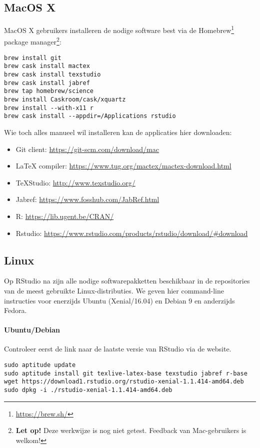 \subsection{MacOS X}

MacOS X gebruikers installeren de nodige software best via de Homebrew\footnote{\url{https://brew.sh/}} package manager\footnote{\textbf{Let op!} Deze werkwijze is nog niet getest. Feedback van Mac-gebruikers is welkom!}:

\begin{verbatim}
brew install git
brew cask install mactex
brew cask install texstudio
brew cask install jabref
brew tap homebrew/science
brew install Caskroom/cask/xquartz
brew install --with-x11 r
brew cask install --appdir=/Applications rstudio
\end{verbatim}

Wie toch alles manueel wil installeren kan de applicaties hier downloaden:

\begin{itemize}
  \item Git client: \url{https://git-scm.com/download/mac}
  \item \LaTeX{} compiler: \url{https://www.tug.org/mactex/mactex-download.html}
  \item TeXStudio: \url{http://www.texstudio.org/}
  \item Jabref: \url{https://www.fosshub.com/JabRef.html}
  \item R: \url{https://lib.ugent.be/CRAN/}
  \item Rstudio: \url{https://www.rstudio.com/products/rstudio/download/#download}
\end{itemize}

\subsection{Linux}

Op RStudio na zijn alle nodige softwarepakketten beschikbaar in de repositories van de meest gebruikte Linux-distributies. We geven hier command-line instructies voor enerzijds Ubuntu (Xenial/16.04) en Debian 9 en anderzijds Fedora.

\paragraph{Ubuntu/Debian} 

Controleer eerst de link naar de laatste versie van RStudio via de website.

\begin{verbatim}
sudo aptitude update
sudo aptitude install git texlive-latex-base texstudio jabref r-base
wget https://download1.rstudio.org/rstudio-xenial-1.1.414-amd64.deb
sudo dpkg -i ./rstudio-xenial-1.1.414-amd64.deb
\end{verbatim}

